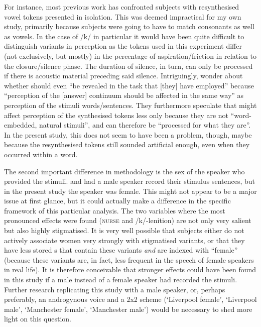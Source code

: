 For instance, most previous work has confronted subjects with resynthesised vowel tokens presented in isolation.
This was deemed impractical for my own study, primarily because subjects were going to have to match consonants as well as vowels.
In the case of /k/ in particular it would have been quite difficult to distinguish variants in perception as the tokens used in this experiment differ (not exclusively, but mostly) in the percentage of aspiration/friction in relation to the closure/silence phase.
The duration of silence, in turn, can only be processed if there is acoustic material preceding said silence.
Intriguingly, \textcite[887--888]{haydrager2010} wonder about whether  should even ``be revealed in the task that [they] have employed'' because ``perception of the [answer] continuum should be affected in the same way'' as perception of the stimuli words/sentences.
They furthermore speculate that  might affect perception of the synthesised tokens less only because they are not ``word-embedded, natural stimuli'', and can therefore be ``processed for what they are''.
In the present study, this does not seem to have been a problem, though, maybe because the resynthesised tokens still sounded artificial enough, even when they occurred within a word.

The second important difference in methodology is the sex of the speaker who provided the stimuli.
\textcite{hayetal2006a} and \textcite{haydrager2010} had a male speaker record their stimulus sentences, but in the present study the speaker was female.
This might not appear to be a major issue at first glance, but it could actually make a difference in the specific framework of this particular analysis.
The two variables where the most pronounced  effects were found (\textsc{nurse} and /k/-lenition) are not only very salient but also highly stigmatised.
It is very well possible that subjects either do not actively associate women very strongly with stigmatised variants, or that they have less stored s that contain these variants \emph{and} are indexed with ``female'' (because these variants are, in fact, less frequent in the speech of female speakers in real life).
It is therefore conceivable that stronger  effects could have been found in this study if a male instead of a female speaker had recorded the stimuli.
Further research replicating this study with a male speaker, or, perhaps preferably, an androgynous voice and a 2x2  scheme (`Liverpool female', `Liverpool male', `Manchester female', `Manchester male') would be necessary to shed more light on this question.

